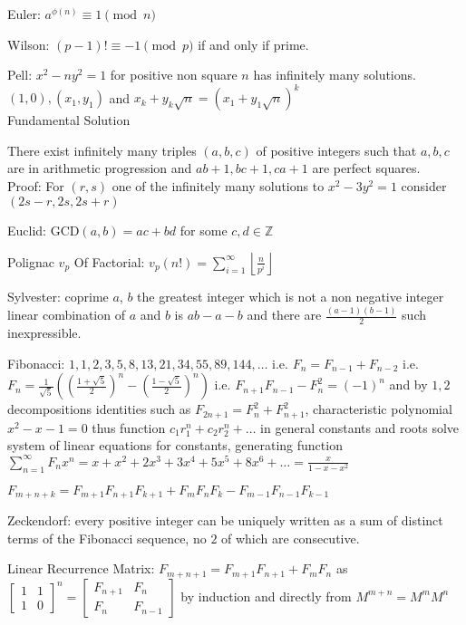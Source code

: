 Euler: $a^{\phi (n)} \equiv 1 \pmod{n}$

Wilson: $(p-1)! \equiv -1 \pmod{p}$ if and only if prime.

Pell: $x^2-ny^2=1$ for positive non square $n$ has infinitely many solutions. \\
$(1,0), (x_1,y_1)$ and $x_k+y_k \sqrt{n}=(x_1+y_1 \sqrt{n})^k$ \\
Fundamental Solution

There exist infinitely many triples $(a,b,c)$ of positive integers such that $a,b,c$ are in arithmetic progression and $ab+1,bc+1,ca+1$ are perfect squares. \\
Proof: For $(r,s)$ one of the infinitely many solutions to $x^2-3y^2=1$ consider $(2s-r,2s,2s+r)$

Euclid: $\text{GCD}(a,b)=ac+bd$ for some $c,d \in \mathbb{Z}$

Polignac $v_p$ Of Factorial: $v_p (n!)=\sum_{i=1}^{\infty} \left\lfloor \frac{n}{p^i} \right\rfloor$

Sylvester: coprime $a$, $b$ the greatest integer which is not a non negative integer linear combination of $a$ and $b$ is $ab-a-b$ and there are $\frac{(a-1)(b-1)}{2}$ such inexpressible.

Fibonacci: $1,1,2,3,5,8,13,21,34,55,89,144,\dots$ i.e. $F_n=F_{n-1}+F_{n-2}$ i.e. $F_n = \frac{1}{\sqrt{5}} \left(\left(\frac{1+\sqrt{5}}{2} \right)^n - \left(\frac{1-\sqrt{5}}{2} \right)^n \right)$ i.e. $F_{n+1} F_{n-1} - F_n^2=(-1)^n$ and by $1,2$ decompositions identities such as $F_{2n+1}=F_{n}^2+F_{n+1}^2$, characteristic polynomial $x^2-x-1=0$ thus function $c_1 r_1^n + c_2 r_2^n + \dots$ in general constants and roots solve system of linear equations for constants, generating function $\sum_{n=1}^{\infty} F_n x^n = x+x^2+2 x^3+3 x^4+5 x^5+8 x^6+\dots = \frac{x}{1-x-x^2}$

$F_{m+n+k}=F_{m+1}F_{n+1}F_{k+1}+F_{m}F_{n}F_{k}-F_{m-1}F_{n-1}F_{k-1}$

Zeckendorf: every positive integer can be uniquely written as a sum of distinct terms of the Fibonacci sequence, no $2$ of which are consecutive.

Linear Recurrence Matrix: $F_{m+n+1}=F_{m+1}F_{n+1}+F_{m}F_{n}$ as $\begin{bmatrix} 1 & 1 \\ 1 & 0 \end{bmatrix}^n = \begin{bmatrix} F_{n+1} & F_n \\ F_n & F_{n-1} \end{bmatrix}$ by induction and directly from $M^{m+n}=M^m M^n$

